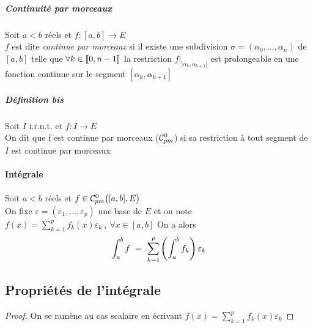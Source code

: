         \newpage
        
        \traitd
    	\subparagraph{Continuité par morceaux}
        		Soit $a<b$ réels et $f:[a,b]\rightarrow E$ \\ 
        		$f$ est dite \emph{continue par morceaux} si il existe une subdivision $\sigma = (\alpha_0 ,\dots ,\alpha_n)$ de $[a,b]$ telle que $\forall k\in {\llbracket 0,n-1 \rrbracket}$ la restriction $f|_{]\alpha_k , \alpha_{k+1}[} $ est prolongeable en une fonction continue sur le segment $[\alpha_k , \alpha_{k+1}]$ 
        \traitdouble
        \subparagraph{Définition bis}
			Soit $I$ i.r.n.t. et $f:I\rightarrow E$ \\
			On dit que f est continue par morceaux (${\mathcal{C}_{pm}^0}$) si sa restriction à tout segment de $I$ est continue par morceaux 
        \trait
    
    	 \medskip
    	
    	
    	\traitd
    	\paragraph{Intégrale}
			Soit $a<b$ réels et $f\in{\mathcal{C}_{pm}^0} \big( [a,b],E \big)$ \\On fixe $\varepsilon = (\varepsilon_1 , \dots , \varepsilon_p)$ une base de $E$ et on note $f(x) = \sum_{k=1}^p f_k(x) \varepsilon_k ~,~\forall x\in [a,b]$ On a alors 
			\[ 
				\int_a^b f ~=~ \sum_{k=1}^{p} \left( \int_a^b f_k \right) \varepsilon_k 
			\vspace{-10pt}
			\] 
		\trait \medskip
		
		
	\subsection{Propriétés de l'intégrale}

		
		\begin{proof} 
		On se ramène au cas scalaire en écrivant $f(x) = \sum_{k=1}^p f_k(x) \varepsilon_k$ 
		\end{proof} \medskip
		
